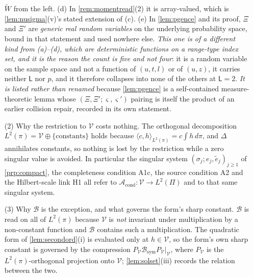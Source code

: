 \begin{remark}
\begin{enumerate}
$\widetilde W$ from the left. \textup{(d)} In \cref{rem:momentread}\textup{(2)} it is array-valued, which
is \cref{lem:nusigma}\textup{(v)}'s stated extension of \textup{(c)}.
\textup{(e)} In \cref{lem:pgence} and its proof, $\Xi$ and $\Xi'$ are \emph{generic real random
variables} on the underlying probability space, bound in that statement and used nowhere else.
\emph{This one is of a different kind from \textup{(a)}--\textup{(d)}, which are deterministic functions
on a range-type index set, and it is the reason the count is five and not four}: it is a random variable
on the sample space and not a function of $(u,t,l)$ or of $(u,z)$, it carries neither $\mathsf L$ nor
$p$, and it therefore collapses into none of the others at $\mathsf L=2$. \emph{It is listed rather than renamed} because \cref{lem:pgence} is a self-contained
measure-theoretic lemma whose $(\Xi,\Xi';\varsigma,\varsigma')$ pairing is itself the product of an
earlier collision repair, recorded in its own statement.
\item[(2)] Why the restriction to $\mathcal V$ costs nothing. The
orthogonal decomposition $L^{2}(\pi)=\mathcal V\oplus\{\text{constants}\}$ holds because
$\langle c,h\rangle_{L^2(\pi)}=c\int h\,d\pi$, and $\Delta$ annihilates constants, so nothing is lost by
the restriction while a zero singular value is avoided. In particular the singular system
$(\sigma_j;e_j,\tilde e_j)_{j\ge1}$ of \cref{prp:compact}, the completeness condition A1c, the source
condition A2 and the Hilbert-scale link H1 all refer to
$\mathcal A_{\mathrm{cond}}:\mathcal V\to L^{2}(\Pi)$ and to that same singular system.
\item[(3)] Why $\mathcal B$ is the exception, and what governs the form's sharp constant.
$\mathcal B$ is read on all of $L^{2}(\pi)$ because $\mathcal V$ is \emph{not} invariant under
multiplication by a non-constant
function and $\mathcal B$ contains such a multiplication. The quadratic form of
\cref{lem:secondord}(i) is evaluated only at $h\in\mathcal V$, so the form's own sharp constant is
governed by the compression $P_{\mathcal V}\mathcal B_{\mathrm{sym}}P_{\mathcal V}|_{\mathcal V}$, where
$P_{\mathcal V}$ is the $L^{2}(\pi)$-orthogonal projection onto $\mathcal V$; \cref{lem:solset}(iii)
records the relation between the two.
\end{enumerate}
\end{remark}

